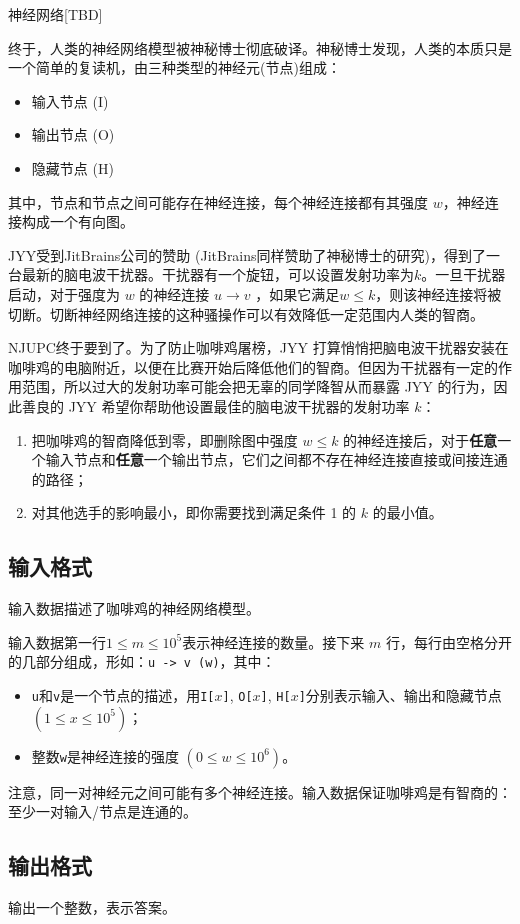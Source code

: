\begin{Problem}{神经网络}{[TBD]}

终于，人类的神经网络模型被神秘博士彻底破译。神秘博士发现，人类的本质只是一个简单的复读机，由三种类型的神经元(节点)组成：

\begin{itemize}
\item 输入节点 (I)
\item 输出节点 (O)
\item 隐藏节点 (H)
\end{itemize}

其中，节点和节点之间可能存在神经连接，每个神经连接都有其强度 $w$，神经连接构成一个有向图。

JYY受到JitBrains公司的赞助 (JitBrains同样赞助了神秘博士的研究)，得到了一台最新的脑电波干扰器。干扰器有一个旋钮，可以设置发射功率为$k$。一旦干扰器启动，对于强度为 $w$ 的神经连接 $u \to v$ ，如果它满足$w \le k$，则该神经连接将被切断。切断神经网络连接的这种骚操作可以有效降低一定范围内人类的智商。

NJUPC终于要到了。为了防止咖啡鸡屠榜，JYY 打算悄悄把脑电波干扰器安装在咖啡鸡的电脑附近，以便在比赛开始后降低他们的智商。但因为干扰器有一定的作用范围，所以过大的发射功率可能会把无辜的同学降智从而暴露 JYY 的行为，因此善良的 JYY 希望你帮助他设置最佳的脑电波干扰器的发射功率 $k$：

\begin{enumerate}
\item 把咖啡鸡的智商降低到零，即删除图中强度 $w \le k$ 的神经连接后，对于\textbf{任意}一个输入节点和\textbf{任意}一个输出节点，它们之间都不存在神经连接直接或间接连通的路径；
\item 对其他选手的影响最小，即你需要找到满足条件 1 的 $k$ 的最小值。
\end{enumerate}

\subsection*{输入格式}

输入数据描述了咖啡鸡的神经网络模型。

输入数据第一行$1\le m \le 10^5$表示神经连接的数量。接下来 $m$ 行，每行由空格分开的几部分组成，形如：\texttt{u -> v (w)}，其中：

\begin{itemize}
\item \texttt{u}和\texttt{v}是一个节点的描述，用\texttt{I[$x$]}, \texttt{O[$x$]}, \texttt{H[$x$]}分别表示输入、输出和隐藏节点 $(1 \le x \le 10^5)$；
\item 整数\texttt{w}是神经连接的强度 $(0\le w\le 10^6)$。
\end{itemize}

注意，同一对神经元之间可能有多个神经连接。输入数据保证咖啡鸡是有智商的：至少一对输入/节点是连通的。

\subsection*{输出格式}

输出一个整数，表示答案。

\setcounter{ExampleNo}{0}


\end{Problem}
